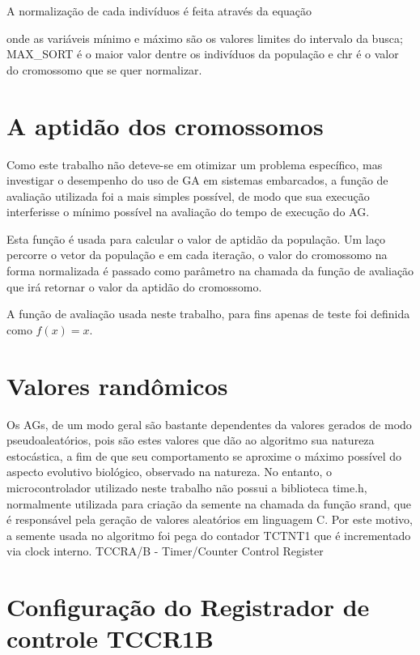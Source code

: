 \documentclass[
    12pt,               %
    twoside,            %
    a4paper,            %
    english,            %
    french,             %
    spanish,            %
    brazil,             %
    ]{abntex2}
\begin{document}
 A normalização  de cada indivíduos é feita  através da equação 
 

 onde as variáveis mínimo e máximo são os valores limites do intervalo da busca; MAX\_SORT é o maior valor dentre os indivíduos da população e chr é o valor do cromossomo que se quer normalizar.

\section{A aptidão dos cromossomos}

  Como este trabalho não deteve-se em otimizar um problema específico, mas investigar o desempenho do uso de GA em sistemas embarcados, a função de avaliação utilizada foi a mais simples possível, de modo que sua execução interferisse o mínimo possível na avaliação do tempo de execução do AG.

  Esta função é usada para calcular o valor de aptidão da população. Um laço percorre o vetor da população e em cada iteração, o valor do cromossomo na forma normalizada é passado como parâmetro na chamada da função de avaliação que irá retornar o valor da aptidão do cromossomo.

  A função de avaliação usada neste trabalho, para fins apenas de teste foi definida como $f(x) = x$.


\section{Valores randômicos}

  Os AGs, de um modo geral são bastante dependentes da valores gerados de modo pseudoaleatórios, pois são estes valores que dão ao algoritmo sua natureza estocástica, a fim de que seu comportamento se aproxime o máximo possível do aspecto evolutivo biológico, observado na natureza. No entanto, o microcontrolador utilizado neste trabalho não possui a biblioteca time.h, normalmente utilizada para criação da semente na chamada da função srand, que é responsável pela geração de valores aleatórios em linguagem C. Por este motivo, a semente usada no algoritmo foi pega do contador TCTNT1  que é incrementado via clock interno. 
  TCCRA/B -  Timer/Counter Control Register

\section{Configuração do Registrador de controle TCCR1B}
\end{document}

